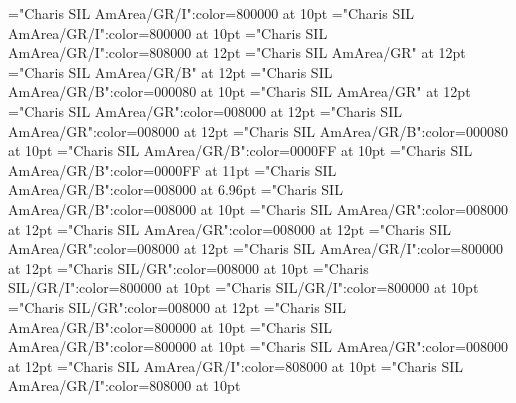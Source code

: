 \documentclass[a4paper,twoside]{article}
\begin{document}
\font\spanmxbheadwordconfigtargetconfigtargetslexsensereferencelexsensereferencesmainentrysubsenses="Charis SIL AmArea/GR/I":color=800000 at 10pt
\font\spanheadwordconfigtargetconfigtargetslexsensereferencelexsensereferencesmainentrysubsenses="Charis SIL AmArea/GR/I":color=800000 at 10pt
\font\translationstes="Charis SIL AmArea/GR/I":color=808000 at 12pt
\font\spanheadwordconfigtargetconfigtargets="Charis SIL AmArea/GR" at 12pt
\font{}="Charis SIL AmArea/GR/B" at 12pt
\font{}="Charis SIL AmArea/GR/B":color=000080 at 10pt
\font{}="Charis SIL AmArea/GR" at 12pt
\font\entryletDatadicBody="Charis SIL AmArea/GR":color=008000 at 12pt
\font\mainheadwordentryletDatadicBody="Charis SIL AmArea/GR":color=008000 at 12pt
\font\spanmxbmainheadwordentryletDatadicBody="Charis SIL AmArea/GR/B":color=000080 at 10pt
\font\aspanmxbmainheadwordentryletDatadicBody="Charis SIL AmArea/GR/B":color=0000FF at 10pt
\font\spanmainheadwordentryletDatadicBody="Charis SIL AmArea/GR/B":color=0000FF at 11pt
\font\homographnumberentryletDatadicBody="Charis SIL AmArea/GR/B":color=008000 at 6.96pt
\font\spanhomographnumberentryletDatadicBody="Charis SIL AmArea/GR/B":color=008000 at 10pt
\font\sensesentryletDatadicBody="Charis SIL AmArea/GR":color=008000 at 12pt
\font\sharedgrammaticalinfosensesentryletDatadicBody="Charis SIL AmArea/GR":color=008000 at 12pt
\font\morphosyntaxanalysissharedgrammaticalinfosensesentryletDatadicBody="Charis SIL AmArea/GR":color=008000 at 12pt
\font\partofspeechmorphosyntaxanalysissharedgrammaticalinfosensesentryletDatadicBody="Charis SIL AmArea/GR/I":color=800000 at 12pt
\font\spanespartofspeechmorphosyntaxanalysissharedgrammaticalinfosensesentryletDatadicBody="Charis SIL/GR":color=008000 at 10pt
\font\spanspanespartofspeechmorphosyntaxanalysissharedgrammaticalinfosensesentryletDatadicBody="Charis SIL/GR/I":color=800000 at 10pt
\font\spanpartofspeechmorphosyntaxanalysissharedgrammaticalinfosensesentryletDatadicBody="Charis SIL/GR/I":color=800000 at 10pt
\font\sensecontentsensesentryletDatadicBody="Charis SIL/GR":color=008000 at 12pt
\font\sensenumbersensecontentsensesentryletDatadicBody="Charis SIL AmArea/GR/B":color=800000 at 10pt
\font\spansensenumbersensecontentsensesentryletDatadicBody="Charis SIL AmArea/GR/B":color=800000 at 10pt
\font\sensesensecontentsensesentryletDatadicBody="Charis SIL AmArea/GR":color=008000 at 12pt
\font{}="Charis SIL AmArea/GR/I":color=808000 at 10pt
\font{}="Charis SIL AmArea/GR/I":color=808000 at 10pt
\end{document}
